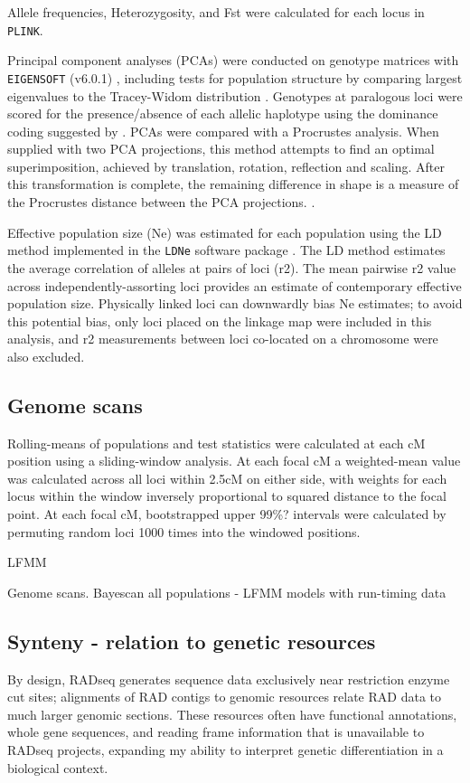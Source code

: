 \documentclass[12pt, one column]{article}
\begin{document}
Allele frequencies, Heterozygosity, and Fst \citep{Weir1984} were calculated for each locus in \texttt{PLINK}.

Principal component analyses (PCAs) were conducted on genotype matrices with \texttt{EIGENSOFT} (v6.0.1) \citep{Patterson2006}, including tests for population structure by comparing largest eigenvalues to the Tracey-Widom distribution \citep{Tracy1994}.  Genotypes at paralogous loci were scored for the presence/absence of each allelic haplotype using the dominance coding suggested by \citet{Patterson2006}. PCAs were compared with a Procrustes analysis. When supplied with two PCA projections, this method attempts to find an optimal superimposition, achieved by translation, rotation, reflection and scaling.  After this transformation is complete, the remaining difference in shape is a measure of the Procrustes distance between the PCA projections. \citep{Peres2001}.

Effective population size (Ne) was estimated for each population using the LD method implemented in the \texttt{LDNe} software package \citep{Waples2010}.  The LD method estimates the average correlation of alleles at pairs of loci (r2). The mean pairwise r2 value across independently-assorting loci provides an estimate of contemporary effective population size. Physically linked loci can downwardly bias Ne estimates; to avoid this potential bias, only loci placed on the linkage map were included in this analysis, and r2 measurements between loci co-located on a chromosome were also excluded.

\subsection*{Genome scans}
Rolling-means of populations and test statistics were calculated at each cM position using a sliding-window analysis. At each focal cM a weighted-mean value was calculated across all loci within 2.5cM on either side, with weights for each locus within the window inversely proportional to squared distance to the focal point. At each focal cM, bootstrapped upper 99\%? intervals were calculated by permuting random loci 1000 times into the windowed positions.

LFMM 

Genome scans.  Bayescan all populations - LFMM models with run-timing data

\subsection*{Synteny - relation to genetic resources}
By design, RADseq generates sequence data exclusively near restriction enzyme cut sites; alignments of RAD contigs to genomic resources relate RAD data to much larger genomic sections.  These resources often have functional annotations, whole gene sequences, and reading frame information that is unavailable to RADseq projects, expanding my ability to interpret genetic differentiation in a biological context.
\end{document}
